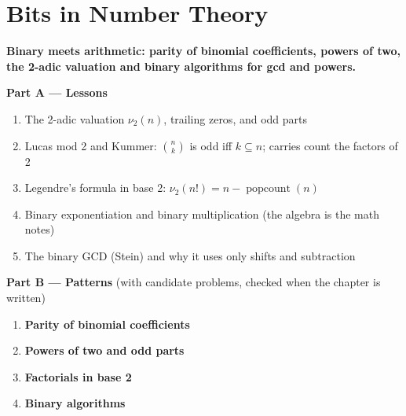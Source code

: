 \chapter{Bits in Number Theory}
\label{ch:number_theory}

\begin{tcolorbox}[enhanced, colback=white, colframe=secondaryblue, boxrule=1pt, arc=2mm]
\textbf{\large\textcolor{primaryblue}{Binary meets arithmetic: parity of binomial coefficients, powers of two, the 2-adic valuation and binary algorithms for gcd and powers.}}
\end{tcolorbox}


\begin{plannedbox}
\textbf{Part A --- Lessons}
\begin{enumerate}[leftmargin=*, label=\textbf{A\arabic*.}, itemsep=1pt]
    \item The 2-adic valuation $\nu_2(n)$, trailing zeros, and odd parts
    \item Lucas mod 2 and Kummer: $\binom{n}{k}$ is odd iff $k \subseteq n$; carries count the factors of 2
    \item Legendre's formula in base 2: $\nu_2(n!) = n - \operatorname{popcount}(n)$
    \item Binary exponentiation and binary multiplication (the algebra is the math notes)
    \item The binary GCD (Stein) and why it uses only shifts and subtraction
\end{enumerate}
\textbf{Part B --- Patterns} (with candidate problems, checked when the chapter is written)
\begin{enumerate}[leftmargin=*, label=\textbf{P\arabic*.}, itemsep=1pt]
    \item \textbf{Parity of binomial coefficients}
    \item \textbf{Powers of two and odd parts}
    \item \textbf{Factorials in base 2}
    \item \textbf{Binary algorithms}
\end{enumerate}
\end{plannedbox}
